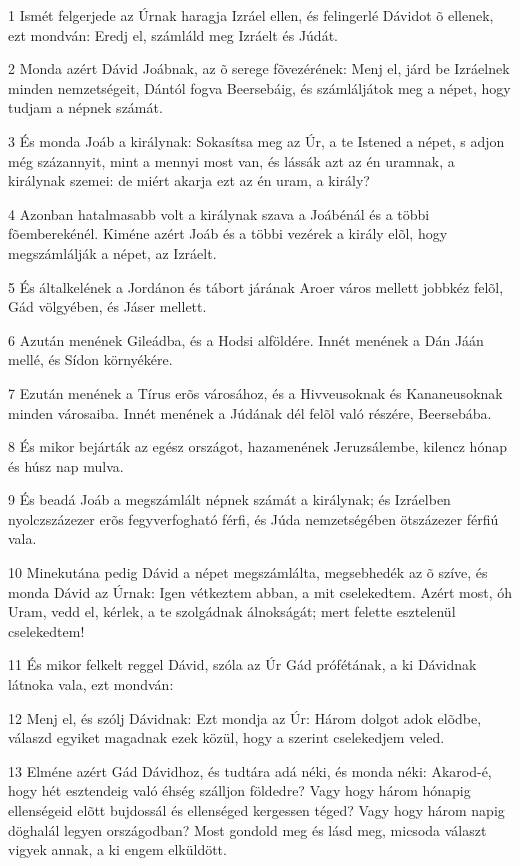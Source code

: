 \par 1 Ismét felgerjede az Úrnak haragja Izráel ellen, és felingerlé Dávidot õ ellenek, ezt mondván: Eredj el, számláld meg Izráelt és Júdát.
\par 2 Monda azért Dávid Joábnak, az õ serege fõvezérének: Menj el, járd be Izráelnek minden nemzetségeit, Dántól fogva Beersebáig, és számláljátok meg a népet, hogy tudjam a népnek számát.
\par 3 És monda Joáb a királynak: Sokasítsa meg az Úr, a te Istened a népet, s adjon még százannyit, mint a mennyi most van, és lássák azt az én uramnak, a királynak szemei: de miért  akarja ezt az én uram, a király?
\par 4 Azonban hatalmasabb volt a királynak szava a Joábénál és a többi fõemberekénél. Kiméne azért Joáb és a többi vezérek a király elõl, hogy megszámlálják a népet, az Izráelt.
\par 5 És általkelének a Jordánon és tábort járának Aroer város mellett jobbkéz felõl, Gád völgyében, és Jáser mellett.
\par 6 Azután menének Gileádba, és a Hodsi alföldére. Innét menének a Dán Jáán mellé, és Sídon környékére.
\par 7 Ezután menének a Tírus erõs városához, és a Hivveusoknak és Kananeusoknak minden városaiba. Innét menének a Júdának dél felõl való részére, Beersebába.
\par 8 És mikor bejárták az egész országot, hazamenének Jeruzsálembe, kilencz hónap és húsz nap mulva.
\par 9 És beadá Joáb a megszámlált népnek számát a királynak; és Izráelben nyolczszázezer erõs fegyverfogható férfi, és Júda nemzetségében ötszázezer férfiú vala.
\par 10 Minekutána pedig Dávid a népet megszámlálta, megsebhedék az õ szíve, és monda Dávid az Úrnak: Igen vétkeztem abban, a mit cselekedtem. Azért most, óh Uram, vedd el, kérlek, a te szolgádnak álnokságát; mert felette esztelenül cselekedtem!
\par 11 És mikor felkelt reggel Dávid, szóla az Úr Gád prófétának, a ki Dávidnak látnoka vala, ezt mondván:
\par 12 Menj el, és szólj Dávidnak: Ezt mondja az Úr: Három dolgot adok elõdbe, válaszd egyiket magadnak ezek közül, hogy a szerint cselekedjem veled.
\par 13 Elméne azért Gád Dávidhoz, és tudtára adá néki, és monda néki: Akarod-é, hogy hét esztendeig való éhség szálljon földedre? Vagy hogy három hónapig ellenségeid elõtt bujdossál és ellenséged kergessen téged? Vagy hogy három napig döghalál legyen országodban? Most gondold meg és lásd meg, micsoda választ vigyek annak, a ki engem elküldött.
